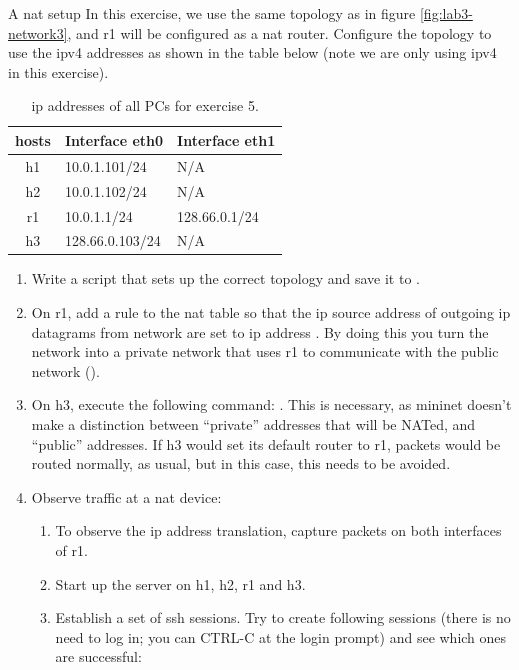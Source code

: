 \begin{exercise}{A \ac{nat} setup}
In this exercise, we use the same topology as in figure \ref{fig:lab3-network3}, and r1 will be configured as a \ac{nat} router. Configure the topology to use the \acs{ipv4} addresses as shown in the table below (note we are only using \acs{ipv4} in this exercise).

\begin{table}[h!t]
	\centering
	\begin{tabular}{| c | l | l |}	
		\hline
		\textbf{hosts} & \textbf{Interface eth0} & \textbf{Interface eth1} \\ \hline
		h1 & 10.0.1.101/24 & N/A \\ \hline
		h2 & 10.0.1.102/24 & N/A \\ \hline
		r1 & 10.0.1.1/24 & 128.66.0.1/24 \\ \hline
		h3 & 128.66.0.103/24 & N/A \\ \hline
	\end{tabular}
	\caption{\acs{ip} addresses of all PCs for exercise 5.}
	\label{tab:lab3-network3-ex5}
\end{table}
\begin{enumerate}
	\item Write a script that sets up the correct topology and save it to .
	\item On r1, add a rule to the \ac{nat} table so that the \acs{ip} source address of outgoing \acs{ip} datagrams from network  are set to \acs{ip} address . By doing this you turn the  network into a private network that uses r1 to communicate with the public network ().
	\item On h3, execute the following command: . This is necessary, as mininet doesn't make a distinction between ``private'' addresses that will be NATed, and ``public'' addresses. If h3 would set its default router to r1, packets would be routed normally, as usual, but in this case, this needs to be avoided.
	\item Observe traffic at a \ac{nat} device:
	\begin{enumerate}
		\item To observe the \acs{ip} address translation, capture packets on both interfaces of r1.
		\item Start up the  server on h1, h2, r1 and h3.
		\item Establish a set of ssh sessions. Try to create following sessions (there is no need to log in; you can CTRL-C at the login prompt) and see which ones are successful:
		

\end{enumerate}
\end{enumerate}
\end{exercise}
